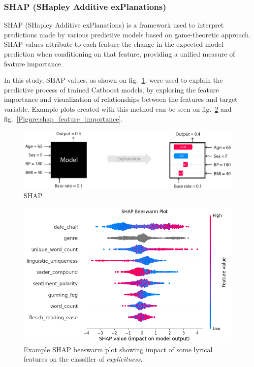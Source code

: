 \subsubsection*{SHAP (SHapley Additive exPlanations)}

SHAP (SHapley Additive exPlanations) is a framework used to interpret
predictions made by various predictive models based on game-theoretic approach.
SHAP values attribute to each feature the change in the expected model
prediction when conditioning on that feature, providing a unified measure
of feature importance. \cite{shap}

In this study, SHAP values, as shown on fig.~\ref{Figure:shap_intro}, were used to
explain the predictive process of trained Catboost models, by exploring the
feature importance and visualization of relationships between the features and
target variable. Example plots created with this method can be seen on
fig.~\ref{Figure:shap_beeswarm} and fig.~\ref{Figure:shap_feature_importance}.

\begin{center}
  \begin{figure}[H]
  \centering
  \includegraphics[width=6in]{img/shap_intro.png}
  \caption{SHAP}
  \label{Figure:shap_intro}
\end{figure}
\end{center}

\begin{center}
  \begin{figure}[H]
  \centering
  \includegraphics[width=6in]{img/shap_beeswarm.png}
  \caption{Example SHAP beeswarm plot showing impact of some lyrical features
  on the classifier of \textit{explicitness}.}
  \label{Figure:shap_beeswarm}
\end{figure}
\end{center}

